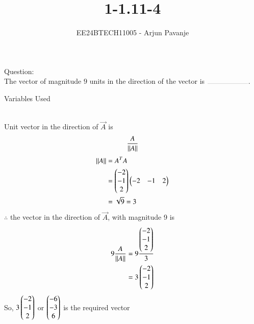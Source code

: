 \documentclass[journal]{IEEEtran}
\begin{document}

\vspace{3cm}

\title{1-1.11-4}
\author{EE24BTECH11005 - Arjun Pavanje
}
{\let\newpage\relax\maketitle}
Question:\\
The vector of magnitude $9$ units in the direction of the vector  is $\rule{2cm}{0.1pt}$.
\begin{table}[h!]    
  \centering
  
  \caption{Variables Used}
  \label{tab1-1.9-6}
\end{table}\\
\solution
Unit vector in the direction of $\vec{A}$ is
\begin{align}
	\frac{A}{\left\lVert A\right\rVert}
\end{align}
\begin{align}
	\left\lVert A\right\rVert &= A^TA\\
	&= \begin{pmatrix}-2\\-1\\2\end{pmatrix}\begin{pmatrix}-2 & -1 & 2\end{pmatrix}\\
	&= \sqrt{9} = 3
\end{align}
$\therefore$ the vector in the direction of $\vec{A}$, with magnitude 9 is
\begin{align}
	9 \frac{A}{\left\lVert A\right\rVert} &= 9 \frac{\begin{pmatrix}-2\\-1\\2\end{pmatrix}}{3}\\
	&= 3\begin{pmatrix}-2\\-1\\2\end{pmatrix}
\end{align}
So, $3\begin{pmatrix}-2\\-1\\2\end{pmatrix}$ or $\begin{pmatrix}-6\\-3\\6\end{pmatrix}$ is the required vector\\
\end{document}
